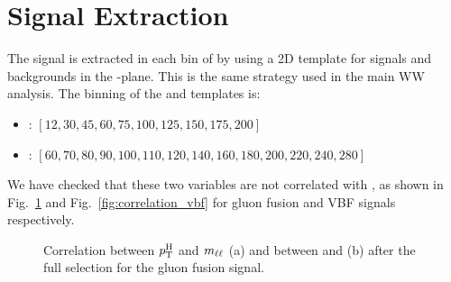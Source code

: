 \section{Signal Extraction}
\label{sec:SignalExtraction}
The signal is extracted in each bin of \pth by using a 2D template for signals and backgrounds in the \mll-\mt plane. This is the same strategy used in the main WW analysis. 
The binning of the \mll and \mt templates is:
\begin{itemize}
\item {\mll: $[12,30,45,60,75,100,125,150,175,200]$} 
\item {\mt: $[60,70,80,90,100,110,120,140,160,180,200,220,240,280]$}
\end{itemize}
We have checked that these two variables are not correlated with \pth, as shown in Fig.~\ref{fig:correlation_ggH} and Fig.~\ref{fig:correlation_vbf} for gluon fusion and VBF signals respectively.
\begin{figure}[htb]
\centering
{}
\caption{Correlation between $p_\mathrm{T}^\mathrm{H}$ and $m_{\ell\ell}$ (a) and between \pth and \mt (b) after the full selection for the gluon fusion signal.\label{fig:correlation_ggH}}
\end{figure}

